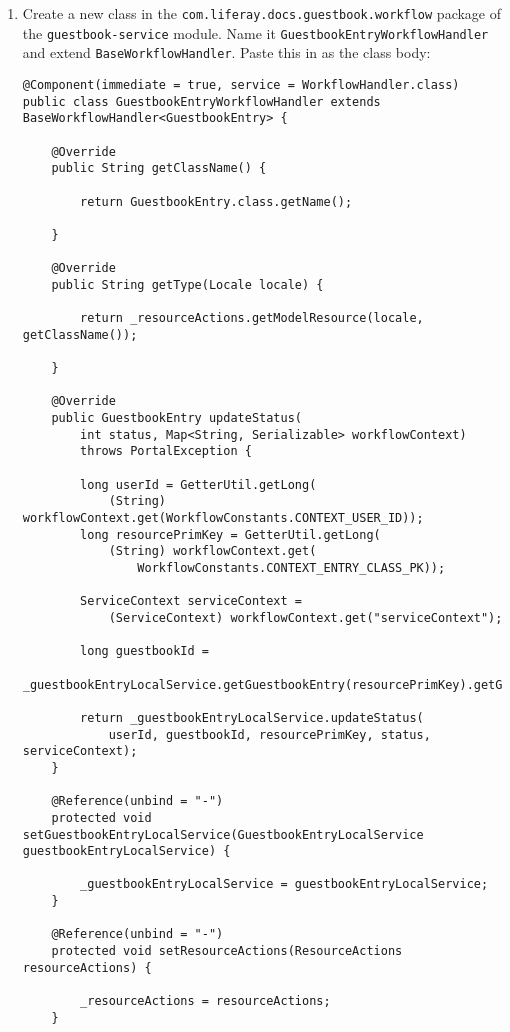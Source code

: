 \begin{enumerate}
\def\labelenumi{\arabic{enumi}.}
\item
  Create a new class in the \texttt{com.liferay.docs.guestbook.workflow}
  package of the \texttt{guestbook-service} module. Name it
  \texttt{GuestbookEntryWorkflowHandler} and extend
  \texttt{BaseWorkflowHandler}. Paste this in as the class body:

\begin{verbatim}
@Component(immediate = true, service = WorkflowHandler.class)
public class GuestbookEntryWorkflowHandler extends BaseWorkflowHandler<GuestbookEntry> {

    @Override
    public String getClassName() {

        return GuestbookEntry.class.getName();

    }

    @Override
    public String getType(Locale locale) {

        return _resourceActions.getModelResource(locale, getClassName());

    }

    @Override
    public GuestbookEntry updateStatus(
        int status, Map<String, Serializable> workflowContext)
        throws PortalException {

        long userId = GetterUtil.getLong(
            (String) workflowContext.get(WorkflowConstants.CONTEXT_USER_ID));
        long resourcePrimKey = GetterUtil.getLong(
            (String) workflowContext.get(
                WorkflowConstants.CONTEXT_ENTRY_CLASS_PK));

        ServiceContext serviceContext =
            (ServiceContext) workflowContext.get("serviceContext");

        long guestbookId =
            _guestbookEntryLocalService.getGuestbookEntry(resourcePrimKey).getGuestbookId();

        return _guestbookEntryLocalService.updateStatus(
            userId, guestbookId, resourcePrimKey, status, serviceContext);
    }

    @Reference(unbind = "-")
    protected void setGuestbookEntryLocalService(GuestbookEntryLocalService guestbookEntryLocalService) {

        _guestbookEntryLocalService = guestbookEntryLocalService;
    }

    @Reference(unbind = "-")
    protected void setResourceActions(ResourceActions resourceActions) {

        _resourceActions = resourceActions;
    }


\end{verbatim}
\end{enumerate}
